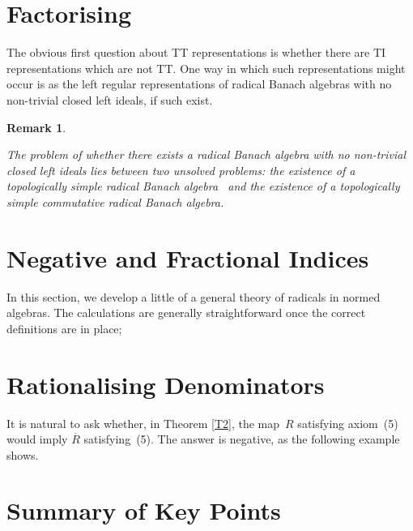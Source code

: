 \documentclass[11pt]{article}
\newtheorem{remk}[thm]{Remark}
\newenvironment{Remark}{\begin{remk}\begin{rm}}{\end{rm}\end{remk}}
\newcommand{\detail}[1]{}
\newcommand{\Rbar}{\overline{R}}
\begin{document}
\section{Factorising}\label{S4a}

The obvious first question about TT representations is whether there are
TI representations which are not TT.   One way in which such representations
might occur is as the left regular representations of radical Banach algebras
with no non-trivial closed left ideals, if such exist.


\begin{Remark}
The problem of whether there exists a radical Banach algebra with no non-trivial
closed left ideals lies between two unsolved problems: the existence of a
topologically simple radical Banach algebra \detail{no non-trivial closed
two-sided ideals}\ and the existence of a topologically simple commutative
radical Banach algebra.  \detail{Might it be equivalent to one of these questions?}
\end{Remark}


\section{Negative and Fractional Indices}\label{S5}

In this section, we develop a little of a general theory of radicals in
normed algebras.    The calculations are generally straightforward once the
correct definitions are in place; 
\section{Rationalising Denominators}\label{S5a}

It is natural to ask whether, in Theorem \ref{T2}, the map~$R$ satisfying
axiom~(5) would imply $\Rbar$ satisfying~(5).    The answer is negative,
as the following example shows.



\section{Summary of Key Points}\label{S6}
\end{document}

